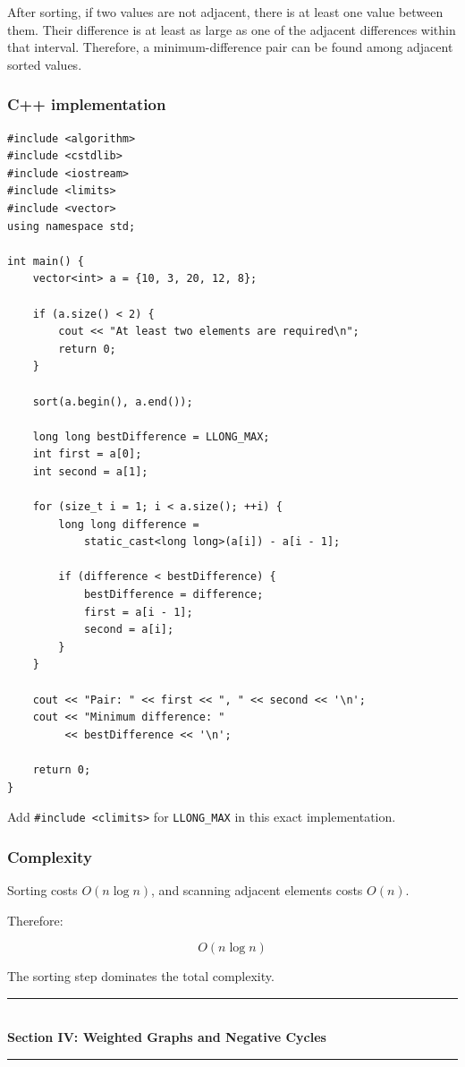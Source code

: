 After sorting, if two values are not adjacent, there is at least one value between them. Their difference is at least as large as one of the adjacent differences within that interval. Therefore, a minimum-difference pair can be found among adjacent sorted values.

\subsubsection{C++ implementation}

\begin{lstlisting}[style=cppstyle]
#include <algorithm>
#include <cstdlib>
#include <iostream>
#include <limits>
#include <vector>
using namespace std;

int main() {
    vector<int> a = {10, 3, 20, 12, 8};

    if (a.size() < 2) {
        cout << "At least two elements are required\n";
        return 0;
    }

    sort(a.begin(), a.end());

    long long bestDifference = LLONG_MAX;
    int first = a[0];
    int second = a[1];

    for (size_t i = 1; i < a.size(); ++i) {
        long long difference =
            static_cast<long long>(a[i]) - a[i - 1];

        if (difference < bestDifference) {
            bestDifference = difference;
            first = a[i - 1];
            second = a[i];
        }
    }

    cout << "Pair: " << first << ", " << second << '\n';
    cout << "Minimum difference: "
         << bestDifference << '\n';

    return 0;
}
\end{lstlisting}

Add \texttt{\#include <climits>} for \texttt{LLONG\_MAX} in this exact implementation.

\subsubsection{Complexity}

Sorting costs $O(n\log n)$, and scanning adjacent elements costs $O(n)$.

Therefore:


\[
\boxed{O(n\log n)}
\]


The sorting step dominates the total complexity.


\newpage
\begin{center}
\vspace{0.5em}
{\color{primary}\rule{0.45\textwidth}{1.2pt}}\\[4pt]
{\Large\bfseries\color{primary} Section IV: Weighted Graphs and Negative Cycles}\\[2pt]
{\color{primary}\rule{0.45\textwidth}{1.2pt}}
\vspace{0.5em}
\end{center}

